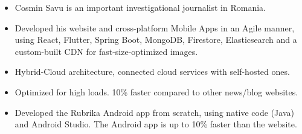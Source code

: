 \documentclass[10pt,a4paper,ragged2e]{resume}
\begin{document}

    \begin{fullwidth}
        \makecvheader
    \end{fullwidth}





    \begin{itemize}
        \item Cosmin Savu is an important investigational journalist in Romania.
        \item Developed his website and cross-platform Mobile Apps in an Agile manner, using React, Flutter, Spring Boot, MongoDB, Firestore, Elasticsearch and a custom-built CDN for fast-size-optimized images.
        \item Hybrid-Cloud architecture, connected cloud services with self-hosted ones.
        \item Optimized for high loads.
        10\% faster compared to other news/blog websites.
    \end{itemize}

    \divider

    \begin{itemize}
        \item Developed the Rubrika Android app from scratch, using native code (Java) and Android Studio.
        The Android app is up to 10\% faster than the website.
        \smallskip
    \end{itemize}
\end{document}
